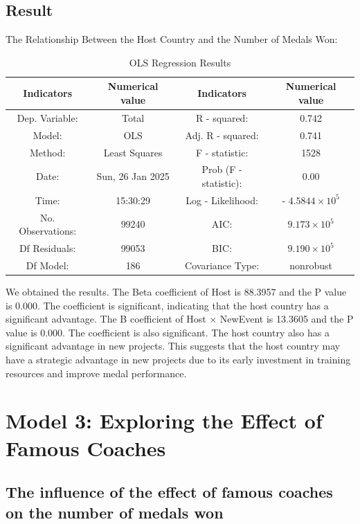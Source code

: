 \documentclass{mcmthesis}  %
\begin{document}
\subsection{Result}  %
\hspace*{1.5em}The Relationship Between the Host Country and the Number of Medals Won:
\begin{table}[H]
\centering
\caption{OLS Regression Results}
\begin{tabular}{|c c|c c|}
\hline
Indicators & Numerical value & Indicators & Numerical value \\
\hline
Dep. Variable: & Total & R - squared: & 0.742 \\
\hline
 Model: & OLS & Adj. R - squared: & 0.741 \\
\hline
 Method: & Least Squares & F - statistic: & 1528 \\
\hline
 Date: & Sun, 26 Jan 2025 & Prob (F - statistic): & 0.00 \\
\hline
Time: & 15:30:29 & Log - Likelihood: & - $4.5844\times 10^{5}$ \\
\hline
 No. Observations: & 99240 & AIC: & $9.173\times 10^{5}$ \\
\hline
 Df Residuals: & 99053 & BIC: & $9.190\times 10^{5}$ \\
\hline
Df Model: & 186 & Covariance Type: & nonrobust  \\
\hline
\end{tabular}
\end{table}
We obtained the results. The Beta coefficient of Host is 88.3957 and the P value is 0.000. The coefficient is significant, indicating that the host country has a significant advantage. The B coefficient of Host × NewEvent is 13.3605 and the P value is 0.000. The coefficient is also significant. The host country also has a significant advantage in new projects. This suggests that the host country may have a strategic advantage in new projects due to its early investment in training resources and improve medal performance.


\section{Model 3: Exploring the Effect of Famous Coaches}  %
\subsection{The influence of the effect of famous coaches on the number of medals won}  %
\end{document}
